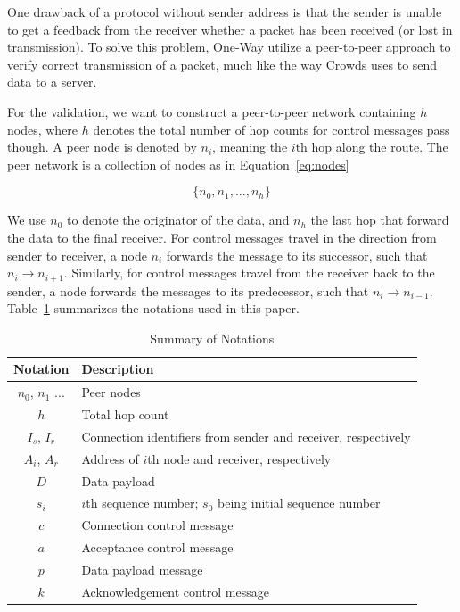 One drawback of a protocol without sender address is that the sender is unable
to get a feedback from the receiver whether a packet has been received (or
lost in transmission). To solve this problem, One-Way utilize a peer-to-peer
approach to verify correct transmission of a packet, much like the way
Crowds\cite{DBLP:journals/tissec/ReiterR98} uses to send data to a server.

For the validation, we want to construct a peer-to-peer network containing
$h$ nodes, where $h$ denotes the total number of hop counts for control
messages pass though. A peer node is denoted by $n_i$, meaning the
$i$th hop along the route. The peer network is a collection of nodes as
in Equation~\ref{eq:nodes}

\begin{equation}\label{eq:nodes}
\{n_0, n_1, ..., n_h\}
\end{equation}

We use $n_0$ to denote the originator of the data, and $n_h$ the last hop
that forward the data to the final receiver. For control messages travel
in the direction from sender to receiver, a node $n_i$ forwards the message
to its successor, such that $n_i \rightarrow n_{i+1}$. Similarly, for
control messages travel from the receiver back to the sender, a node
forwards the messages to its predecessor, such that
$n_{i} \rightarrow n_{i-1}$. Table~\ref{tab:notations} summarizes the
notations used in this paper.

\begin{table}[h]
\centering
\caption{Summary of Notations} \label{tab:notations}
\begin{tabular}{c|l}
\hline
{\bf Notation} & {\bf Description}\\
\hline
$n_0$, $n_1$ ... & Peer nodes\\
$h$ & Total hop count\\
$I_s$, $I_r$ & Connection identifiers from sender and receiver, respectively\\
$A_i$, $A_r$ & Address of $i$th node and receiver, respectively\\
$D$ & Data payload\\
$s_i$ & $i$th sequence number; $s_0$ being initial sequence number\\
$c$ & Connection control message\\
$a$ & Acceptance control message\\
$p$ & Data payload message\\
$k$ & Acknowledgement control message\\
\hline
\end{tabular}
\end{table}

